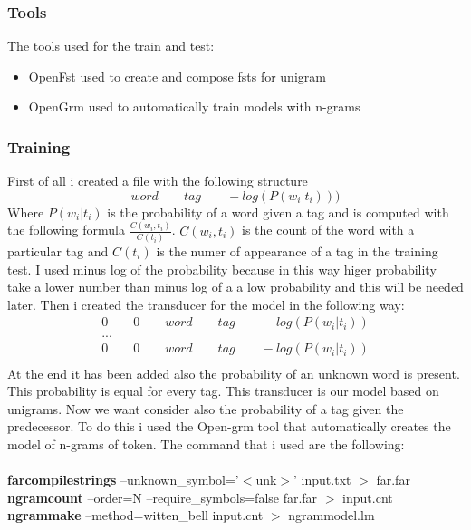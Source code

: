 \documentclass[a4paper,8pt,oneside]{article}
\begin{document}
		\subsubsection{Tools}
			The tools used for the train and test:
			\begin{itemize}
				\item OpenFst used to create and compose fsts for unigram
				\item OpenGrm used to automatically train models with n-grams
			\end{itemize}
		\subsubsection{Training}
			First of all i created a file with the following structure
			\begin{equation}
				word \qquad tag \qquad -log(P(w_i|t_i)))
			\end{equation}
			Where $P(w_i|t_i)$ is the probability of a word given a tag and is computed with the following formula $\frac{C(w_i,t_i)}{C(t_i)}$. $C(w_i,t_i)$ is the count of the word with a particular tag and $C(t_i)$ is the numer of appearance of a tag in the training test. I used minus log of the probability because in this way higer probability take a lower number than minus log of a  a low probability and this will be needed later. Then i created the transducer for the model in the following way:
			\begin{gather*}
					0 \qquad 0 \qquad word \qquad tag \qquad -log(P(w_i|t_i)) \\
					... \\
					0 \qquad 0 \qquad word \qquad tag \qquad -log(P(w_i|t_i)) \\
			\end{gather*}
			At the end it has been added also the probability of an unknown word is present. This probability is equal for every tag. This transducer is our model based on unigrams. Now we want consider also the probability of a tag given the predecessor. To do this i used the Open-grm tool that automatically creates the model of n-grams of token. The command that i used are the following:\\ \\

			\textbf{farcompilestrings} --unknown\_symbol='$<$unk$>$' input.txt $>$ far.far \\
			\textbf{ngramcount} --order=N --require\_symbols=false far.far $>$ input.cnt \\
			\textbf{ngrammake} --method=witten\_bell input.cnt $>$ ngrammodel.lm \\ \\
\end{document}
